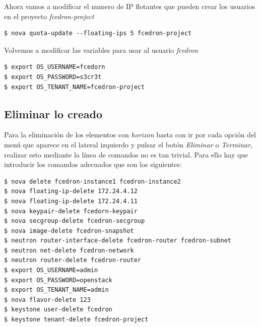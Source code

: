 \documentclass{article}
\begin{document}
	Ahora vamos a modificar el numero de IP flotantes que pueden crear los usuarios en el proyecto \emph{fcedron-project}
\begin{lstlisting}[style=miniBash]
$ nova quota-update --floating-ips 5 fcedron-project
\end{lstlisting}

	Volvemos a modificar las variables para usar al usuario \emph{fcedron}
\begin{lstlisting}[style=miniBash]
$ export OS_USERNAME=fcedorn
$ export OS_PASSWORD=s3cr3t
$ export OS_TENANT_NAME=fcedron-project
\end{lstlisting}

\subsection{Eliminar lo creado}
	Para la eliminación de los elementos con \emph{horizon} basta con ir por cada opción del menú que aparece en el lateral izquierdo y pulsar el botón \emph{Eliminar} o \emph{Terminar}, realizar esto mediante la línea de comandos no es tan trivial. Para ello hay que introducir los comandos adecuados que son los siguientes:
\begin{lstlisting}[style=miniBash]
$ nova delete fcedron-instance1 fcedron-instance2
$ nova floating-ip-delete 172.24.4.12
$ nova floating-ip-delete 172.24.4.11
$ nova keypair-delete fcedorn-keypair
$ nova secgroup-delete fcedron-secgroup
$ nova image-delete fcedron-snapshot
$ neutron router-interface-delete fcedron-router fcedron-subnet
$ neutron net-delete fcedron-network
$ neutron router-delete fcedron-router
$ export OS_USERNAME=admin
$ export OS_PASSWORD=openstack
$ export OS_TENANT_NAME=admin
$ nova flavor-delete 123
$ keystone user-delete fcedron
$ keystone tenant-delete fcedron-project
\end{lstlisting}
	

%


\end{document}
